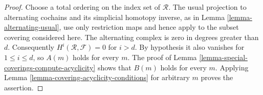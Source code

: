 \begin{proof}
Choose a total ordering on the index set of $\mathcal R$. The usual
projection to alternating cochains and its simplicial homotopy inverse, as
in Lemma \ref{lemma-alternating-usual}, use only restriction maps and hence
apply to the subset covering considered here. The alternating complex is
zero in degrees greater than $d$. Consequently
$H^i(\mathcal R,\mathcal F)=0$ for $i>d$. By hypothesis it also vanishes
for $1\leq i\leq d$, so $A(m)$ holds for every $m$. The proof of Lemma
\ref{lemma-special-coverings-compute-acyclicity} shows that $B(m)$ holds for
every $m$. Applying Lemma \ref{lemma-covering-acyclicity-conditions} for
arbitrary $m$ proves the assertion.
\end{proof}
